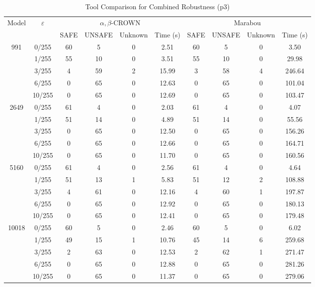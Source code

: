 \begin{table}[htbp]
\centering
\caption{Tool Comparison for Combined Robustness (p3)}
\label{tab:p3_tool_comparison}
\begin{tabular}{|c|c|c|c|c|c|c|c|c|c|}
\hline
\multirow{2}{*}{Model} & \multirow{2}{*}{$\varepsilon$} & \multicolumn{4}{c|}{$\alpha,\beta$-CROWN} & \multicolumn{4}{c|}{Marabou} \\ \cline{3-10}
 & & SAFE & UNSAFE & Unknown & Time (s) & SAFE & UNSAFE & Unknown & Time (s) \\ \hline
\multirow{5}{*}{991} & 0/255 & 60 & 5 & 0 & 2.51 & 60 & 5 & 0 & 3.50 \\ 
  & 1/255 & 55 & 10 & 0 & 3.51 & 55 & 10 & 0 & 29.98 \\ 
  & 3/255 & 4 & 59 & 2 & 15.99 & 3 & 58 & 4 & 246.64 \\ 
  & 6/255 & 0 & 65 & 0 & 12.63 & 0 & 65 & 0 & 101.04 \\ 
  & 10/255 & 0 & 65 & 0 & 12.69 & 0 & 65 & 0 & 103.47 \\ \hline
\hline
\multirow{5}{*}{2649} & 0/255 & 61 & 4 & 0 & 2.03 & 61 & 4 & 0 & 4.07 \\ 
  & 1/255 & 51 & 14 & 0 & 4.89 & 51 & 14 & 0 & 55.56 \\ 
  & 3/255 & 0 & 65 & 0 & 12.50 & 0 & 65 & 0 & 156.26 \\ 
  & 6/255 & 0 & 65 & 0 & 12.66 & 0 & 65 & 0 & 164.71 \\ 
  & 10/255 & 0 & 65 & 0 & 11.70 & 0 & 65 & 0 & 160.56 \\ \hline
\hline
\multirow{5}{*}{5160} & 0/255 & 61 & 4 & 0 & 2.56 & 61 & 4 & 0 & 4.64 \\ 
  & 1/255 & 51 & 13 & 1 & 5.83 & 51 & 12 & 2 & 108.88 \\ 
  & 3/255 & 4 & 61 & 0 & 12.16 & 4 & 60 & 1 & 197.87 \\ 
  & 6/255 & 0 & 65 & 0 & 12.92 & 0 & 65 & 0 & 180.13 \\ 
  & 10/255 & 0 & 65 & 0 & 12.41 & 0 & 65 & 0 & 179.48 \\ \hline
\hline
\multirow{5}{*}{10018} & 0/255 & 60 & 5 & 0 & 2.46 & 60 & 5 & 0 & 6.02 \\ 
  & 1/255 & 49 & 15 & 1 & 10.76 & 45 & 14 & 6 & 259.68 \\ 
  & 3/255 & 2 & 63 & 0 & 12.53 & 2 & 62 & 1 & 271.47 \\ 
  & 6/255 & 0 & 65 & 0 & 12.88 & 0 & 65 & 0 & 281.26 \\ 
  & 10/255 & 0 & 65 & 0 & 11.37 & 0 & 65 & 0 & 279.06 \\ 
\hline
\end{tabular}
\end{table}

